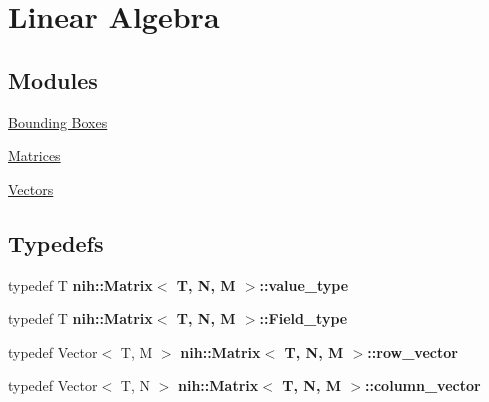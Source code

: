 \hypertarget{group__linalg}{
\section{\-Linear \-Algebra}
\label{group__linalg}
}
\subsection*{\-Modules}
\begin{DoxyCompactItemize}
\item 
\hyperlink{group__bboxes}{\-Bounding Boxes}
\item 
\hyperlink{group__matrices}{\-Matrices}
\item 
\hyperlink{group__vectors}{\-Vectors}
\end{DoxyCompactItemize}
\subsection*{\-Typedefs}
\begin{DoxyCompactItemize}
\item 
\hypertarget{group__linalg_ga57a6a191f034235a2090e25f7e4216bc}{
typedef \-T {\bfseries nih\-::\-Matrix$<$ T, N, M $>$\-::value\-\_\-type}}
\label{group__linalg_ga57a6a191f034235a2090e25f7e4216bc}

\item 
\hypertarget{group__linalg_ga084e3e4c41631a62d3eeeb2b434fa821}{
typedef \-T {\bfseries nih\-::\-Matrix$<$ T, N, M $>$\-::\-Field\-\_\-type}}
\label{group__linalg_ga084e3e4c41631a62d3eeeb2b434fa821}

\item 
\hypertarget{group__linalg_ga5fda3b8edf6f01802cb90be364fb25a6}{
typedef \-Vector$<$ \-T, \-M $>$ {\bfseries nih\-::\-Matrix$<$ T, N, M $>$\-::row\-\_\-vector}}
\label{group__linalg_ga5fda3b8edf6f01802cb90be364fb25a6}

\item 
\hypertarget{group__linalg_ga163c5c162d300e8dccac52a74a8df252}{
typedef \-Vector$<$ \-T, \-N $>$ {\bfseries nih\-::\-Matrix$<$ T, N, M $>$\-::column\-\_\-vector}}
\label{group__linalg_ga163c5c162d300e8dccac52a74a8df252}

\end{DoxyCompactItemize}
